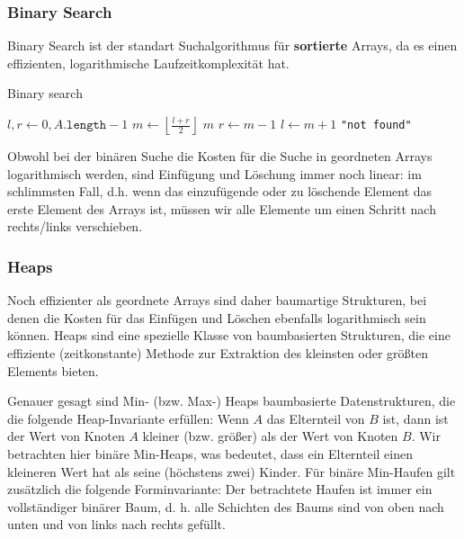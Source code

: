 \documentclass[a4paper]{article}
\begin{document}
\subsubsection{Binary Search} \label{BinarySearch}
    Binary Search ist der standart Suchalgorithmus für \textbf{sortierte} Arrays, da es einen effizienten, logarithmische Laufzeitkomplexität hat.

\begin{algorithm}
\caption{Binary search} 
\begin{algorithmic}[1]
   
  \State $l, r \gets 0, A\texttt{.length}-1$
  \State $m \gets \left\lfloor \frac{l+r}{2} \right\rfloor$
  \State \Return $m$
  \State $r \gets m-1$
  \Else
  \State $l \gets m+1$
  \EndIf
  \EndWhile
  \State \Return \texttt{"not found"}
  \EndFunction
\end{algorithmic}
\end{algorithm}
Obwohl bei der binären Suche die Kosten für die Suche in geordneten Arrays logarithmisch werden, sind Einfügung und Löschung immer noch linear: im schlimmsten Fall, d.h. wenn das einzufügende oder zu löschende Element das erste Element des Arrays ist, müssen wir alle Elemente um einen Schritt nach rechts/links verschieben.

\subsubsection{Heaps}
Noch effizienter als geordnete Arrays sind daher baumartige Strukturen, bei denen die Kosten für das Einfügen und Löschen ebenfalls logarithmisch sein können. Heaps sind eine spezielle Klasse von baumbasierten Strukturen, die eine effiziente (zeitkonstante) Methode zur Extraktion des kleinsten oder größten Elements bieten.

Genauer gesagt sind Min- (bzw. Max-) Heaps baumbasierte Datenstrukturen, die die folgende Heap-Invariante erfüllen: Wenn $A$ das Elternteil von $B$ ist, dann ist der Wert von Knoten $A$ kleiner (bzw. größer) als der Wert von Knoten $B$. Wir betrachten hier binäre Min-Heaps, was bedeutet, dass ein Elternteil einen kleineren Wert hat als seine (höchstens zwei) Kinder. Für binäre Min-Haufen gilt zusätzlich die folgende Forminvariante: Der betrachtete Haufen ist immer ein vollständiger binärer Baum, d. h. alle Schichten des Baums sind von oben nach unten und von links nach rechts gefüllt.
\end{document}

